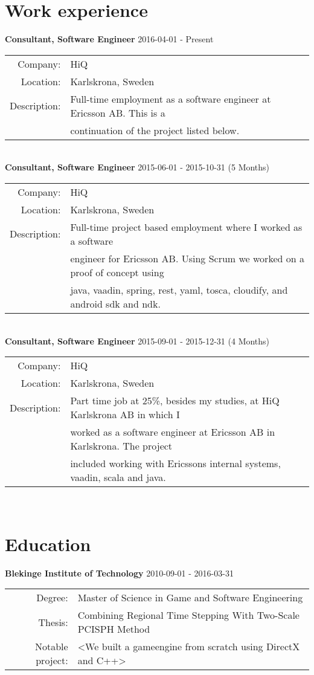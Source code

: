 \documentclass[a4paper,10pt]{article}
\begin{document}
\section{Work experience}
\textbf{Consultant, Software Engineer} 2016-04-01 - Present \\
\begin{tabular}{rl}
Company:& HiQ \\
Location:& Karlskrona, Sweden \\
Description:& Full-time employment as a software engineer at Ericsson AB. This is a\\&
continuation of the project listed below.
\end{tabular}\\

\textbf{Consultant, Software Engineer} 2015-06-01 - 2015-10-31 (5 Months)\\
\begin{tabular}{rl}
Company:& HiQ \\
Location:& Karlskrona, Sweden \\
Description:& Full-time project based employment where I worked as a software \\&
engineer for Ericsson AB. Using Scrum we worked on a proof of concept using\\& 
java, vaadin, spring, rest, yaml, tosca, cloudify, and android sdk and ndk.\\
\end{tabular}\\

\textbf{Consultant, Software Engineer} 2015-09-01 - 2015-12-31 (4 Months) \\
\begin{tabular}{rl}
Company:& HiQ \\
Location:& Karlskrona, Sweden \\
Description:& Part time job at 25\%, besides my studies, at HiQ Karlskrona AB in which I\\&
worked as a software engineer at Ericsson AB in Karlskrona. The project\\&
included working with Ericssons internal systems, vaadin, scala and java.
\end{tabular}\\


\section{Education}
\textbf{Blekinge Institute of Technology} 2010-09-01 - 2016-03-31 \\
\begin{tabular}{rl}
Degree:&  Master of Science in Game and Software Engineering\\
Thesis:& Combining Regional Time Stepping With Two-Scale PCISPH Method \\
Notable project:& <We built a gameengine from scratch using DirectX and C++>
\end{tabular}\\
\end{document}
